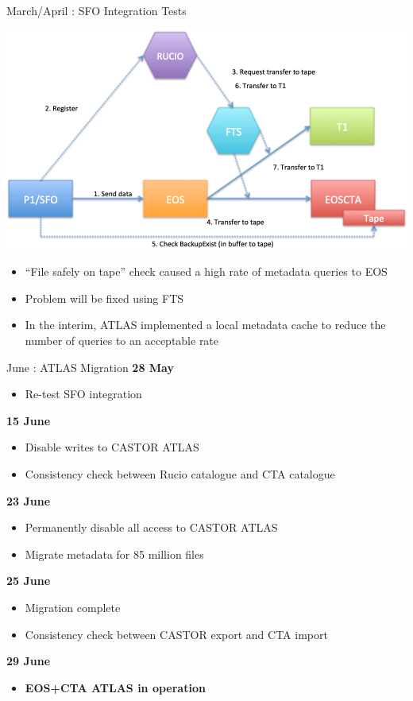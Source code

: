 \documentclass[aspectratio=1610]{beamer}
\begin{document}
\begin{frame}{March/April : SFO Integration Tests}{}
   \begin{center}
      \includegraphics[width=0.5\linewidth]{images/SFO_test_setup}
   \end{center}
      {\normalsize
      \begin{itemize}
         \item ``File safely on tape'' check caused a high rate of metadata queries to EOS
         \item Problem will be fixed using FTS
         \item In the interim, ATLAS implemented a local metadata cache to reduce the number of
            queries to an acceptable rate
      \end{itemize}}
\end{frame}

\begin{frame}{June : ATLAS Migration}
   \normalsize
   \textbf{28 May}
   \begin{itemize}
      \item Re-test SFO integration
   \end{itemize}
   \textbf{15 June}
   \begin{itemize}
      \item Disable writes to CASTOR ATLAS
      \item Consistency check between Rucio catalogue and CTA catalogue
   \end{itemize}
   \textbf{23 June}
   \begin{itemize}
      \item Permanently disable all access to CASTOR ATLAS
      \item Migrate metadata for 85 million files
   \end{itemize}
   \textbf{25 June}
   \begin{itemize}
      \item Migration complete
      \item Consistency check between CASTOR export and CTA import
   \end{itemize}
   \textbf{29 June}
   \begin{itemize}
      \item \textbf{EOS+CTA ATLAS in operation}
   \end{itemize}
\end{frame}
\end{document}

